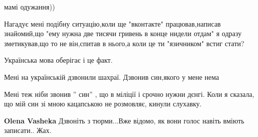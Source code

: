 \begin{itemize}
 
мамі одужання))

 

Нагадує мені подібну ситуацію,коли ще "вконтакте" працював,написав знайомий,що
"ему нужна две тисячи гривень в конце нидели отдам" я одразу зметикував,що то
не він,спитав в нього,а коли це ти "язичником" встиг стати?

Українська мова оберігає і це факт.

 
Мені на українській дзвонили шахраї. Дзвонив син,якого у мене нема

 

Мені теж ніби звонив '' син'' , що в міліції і срочно нужни дєнгі. Коли я
сказала, що мій син зі мною кацапською не розмовляє, кинули слухавку. \Smiley[1.0][yellow]

\begin{itemize}
 
\textbf{Olena Vasheka} Дзвоніть з тюрми...Вже відомо, як вони голос навіть вміють записати..
Жах.
\end{itemize}

 


\end{itemize}
